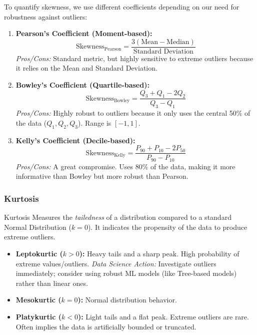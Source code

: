 To quantify skewness, we use different coefficients depending on our need for robustness against outliers:

\begin{enumerate}
    \item \textbf{Pearson's Coefficient (Moment-based):}
    \begin{equation}
        \text{Skewness}_{\text{Pearson}} = \frac{3(\text{Mean} - \text{Median})}{\text{Standard Deviation}}
    \end{equation}
    \textit{Pros/Cons:} Standard metric, but highly sensitive to extreme outliers because it relies on the Mean and Standard Deviation.

    \item \textbf{Bowley's Coefficient (Quartile-based):}
    \begin{equation}
        \text{Skewness}_{\text{Bowley}} = \frac{Q_3 + Q_1 - 2Q_2}{Q_3 - Q_1}
    \end{equation}
    \textit{Pros/Cons:} Highly robust to outliers because it only uses the central 50\% of the data ($Q_1, Q_2, Q_3$). Range is $[-1, 1]$.

    \vs
    \item \textbf{Kelly's Coefficient (Decile-based):}
    \begin{equation}
        \text{Skewness}_{\text{Kelly}} = \frac{P_{90} + P_{10} - 2P_{50}}{P_{90} - P_{10}}
    \end{equation}
    \textit{Pros/Cons:} A great compromise. Uses 80\% of the data, making it more informative than Bowley but more robust than Pearson.
\end{enumerate}

\subsubsection{Kurtosis}

\begin{defbox}{Kurtosis}
Measures the \textit{tailedness} of a distribution compared to a standard Normal Distribution ($k=0$). It indicates the propensity of the data to produce extreme outliers.
\end{defbox}

\begin{itemize}
    \item \textbf{Leptokurtic ($k > 0$):} Heavy tails and a sharp peak. High probability of extreme values/outliers. \textit{Data Science Action:} Investigate outliers immediately; consider using robust ML models (like Tree-based models) rather than linear ones.
    \item \textbf{Mesokurtic ($k = 0$):} Normal distribution behavior.
    \item \textbf{Platykurtic ($k < 0$):} Light tails and a flat peak. Extreme outliers are rare. Often implies the data is artificially bounded or truncated.
\end{itemize}

